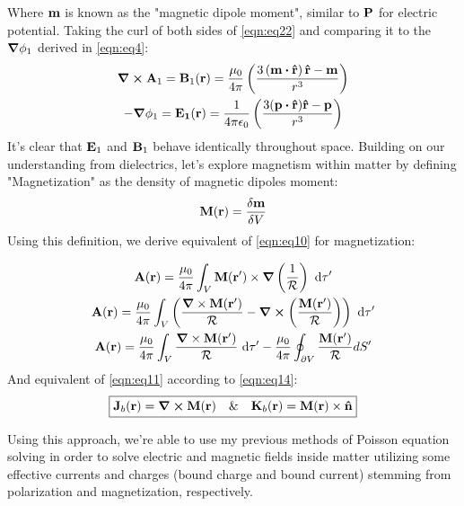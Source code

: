 \documentclass{article}
\numberwithin{equation}{section}
\begin{document}
%
Where $\vb{m}$ is known as the "magnetic dipole moment", similar to $\vb{P}$ for electric potential. Taking the curl of both sides of \eqref{eqn:eq22} and comparing it to the $\grad\phi_1$ derived in \eqref{eqn:eq4}:
%
\begin{gather}
\curl\vb{A}_1 = \vb{B}_1 (\vb{r}) = \frac{\mu_0}{4\pi} \left( \frac{3\left( \vb{m}\vdot\vu{r}\right)\vu{r}-\vb{m}}{r^3}\right)\label{eqn:eq23}\\-\grad\phi_1=\vb{E_1}(\vb{r})=\frac{1}{4\pi\epsilon_0} \left( \frac{3(\vb{p}\vdot\vu{r})\vu{r}-\vb{p}}{r^3}\right)\nonumber
\end{gather}
%
It's clear that $\vb{E}_1$ and $\vb{B}_1$ behave identically throughout space. Building on our understanding from dielectrics, let's explore magnetism within matter by defining "Magnetization" as the density of magnetic dipoles moment:
%
\begin{equation}
\label{eqn:eq24}
\vb{M}(\vb{r})=\fdv{\vb{m}}{V}
\end{equation}
%
Using this definition, we derive equivalent of \eqref{eqn:eq10} for magnetization:

%
\begin{gather}
\vb{A}(\vb{r})=\frac{\mu_0}{4\pi} \int_V \vb{M}(\vb{r'})\times\grad\left(\frac{1}{\mathcal{R}}\right)\ \dd\tau'\nonumber\\\vb{A}(\vb{r})=\frac{\mu_0}{4\pi} \int_V \left( \frac{\grad \times \vb{M}(\vb{r'})}{\mathcal{R}} - \curl\left( \frac{\vb{M}(\vb{r'})}{\mathcal{R}}\right)\right)\ \dd\tau'\nonumber\\ \vb{A}(\vb{r}) = \frac{\mu_0}{4\pi} \int_V\frac{\grad \times \vb{M}(\vb{r'})}{\mathcal{R}}\ \dd\tau'-\frac{\mu_0}{4\pi} \oint_{\partial V} \frac{\vb{M}(\vb{r'})}{\mathcal{R}} dS'\label{eqn:eq25}
\end{gather}
%
And equivalent of \eqref{eqn:eq11} according to \eqref{eqn:eq14}:
%
\begin{equation}
\boxed{\vb{J}_b(\vb{r})=\curl\vb{M}(\vb{r})\quad\&\quad\vb{K}_b(\vb{r})=\vb{M}(\vb{r})\times\vu{n}}\label{eqn:eq26}
\end{equation}
%
\par
Using this approach, we're able to use my previous methods of Poisson equation solving in order to solve electric and magnetic fields inside matter utilizing some effective currents and charges (bound charge and bound current) stemming from polarization and magnetization, respectively.
\end{document}
